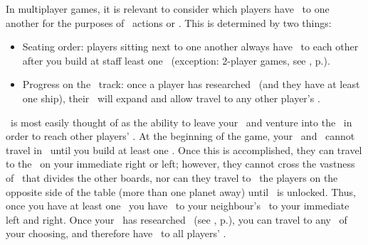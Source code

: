 In multiplayer games, it is relevant to consider which players have \reach\ to one another for the purposes of \military\ actions or \trade.  This is determined by two things:
\begin{itemize}
	\item Seating order: players sitting next to one another always have \reach\ to each other after you build at staff least one \starship\ (exception: 2-player games, see , p.\pageref{sec:playercount}).
	\item Progress on the \tech\ track: once a player has researched \warpdrive\ (and they have at least one ship), their \reach\ will expand and allow travel to any other player's \planet.
\end{itemize}
\reach\ is most easily thought of as the ability to leave your \planet\ and venture into the \outerspace\ in order to reach other players' \planets.  At the beginning of the game, your \convoys\ and \squadrons\ cannot travel in \outerspace\ until you build at least one \starship.  Once this is accomplished, they can travel to the \planet\ on your immediate right or left; however, they cannot cross the vastness of \outerspace\ that divides the other boards, nor can they travel to \reach\ the players on the opposite side of the table (more than one planet away) until \warpdrive\ is unlocked.
\newline\newline
Thus, once you have at least one \starship\ you have \reach\ to your neighbour’s \planet\ to your immediate left and right.  Once your \planet\ has researched \warpdrive\ (see , p.\pageref{sec:technology}), you can travel to any \planet\ of your choosing, and therefore have \reach\ to all players’ \planets.
